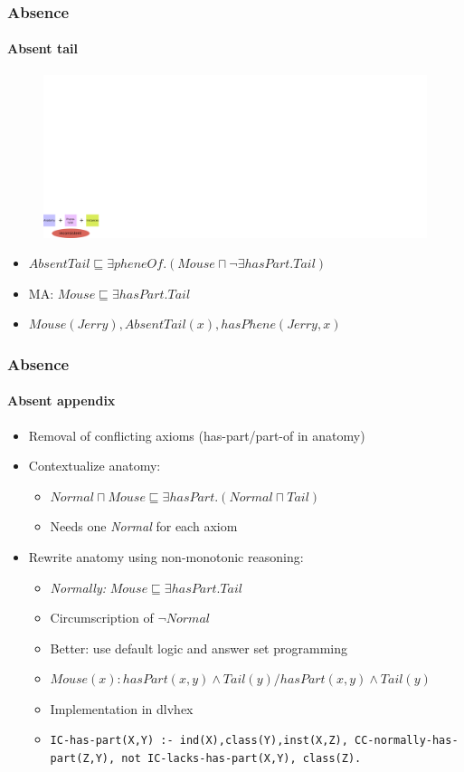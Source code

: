 \documentclass{beamer}
\renewcommand{\em}{\itshape}
\begin{document}
\begin{frame}
  \frametitle{Absence}
  \framesubtitle{Absent tail}
  \begin{figure}
    \includegraphics[scale=.5]{incon.pdf}
  \end{figure}
  \begin{itemize}
  \item $AbsentTail \sqsubseteq \exists pheneOf.(Mouse \sqcap \neg
    \exists hasPart.Tail)$
  \item MA: $Mouse \sqsubseteq \exists hasPart.Tail$
  \item $Mouse(Jerry), AbsentTail(x), hasPhene(Jerry, x)$
  \end{itemize}
\end{frame}

\begin{frame}
  \frametitle{Absence}
  \framesubtitle{Absent appendix}
  \begin{itemize}
  \item Removal of conflicting axioms (has-part/part-of in anatomy)
    \pause
  \item Contextualize anatomy:
    \begin{itemize}
    \item $Normal \sqcap Mouse \sqsubseteq \exists hasPart.(Normal
      \sqcap Tail)$
    \item Needs one {\em Normal} for each axiom
    \end{itemize}
    \pause
  \item Rewrite anatomy using non-monotonic reasoning:
    \begin{itemize}
    \item {\em Normally:} $Mouse \sqsubseteq \exists hasPart.Tail$
    \item Circumscription of $\neg Normal$
    \item Better: use default logic and answer set programming
    \item $Mouse(x):hasPart(x,y)\land Tail(y)/hasPart(x,y)\land Tail(y)$
    \item Implementation in dlvhex 
    \item {\small \texttt{IC-has-part(X,Y) :-
          ind(X),class(Y),inst(X,Z), CC-normally-has-part(Z,Y), not
          IC-lacks-has-part(X,Y), class(Z).}}
    \end{itemize}
  \end{itemize}
\end{frame}
\end{document}
